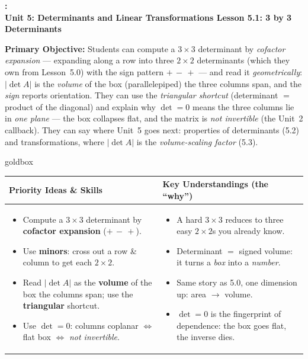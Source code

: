 \documentclass[10pt]{article}
\newcommand{\UnitNumberName}{Unit 5: Determinants and Linear Transformations \quad}
\newcommand{\LessonNumberName}{Lesson 5.1: 3 by 3 Determinants}
\begin{document}
\begin{center}
    {\Large\bfseries \CourseName: \SchoolYear \\
    {\small\bfseries \UnitNumberName \LessonNumberName}}
\end{center}

\begin{tcolorbox}[colback=blush, colframe=burgundy, boxrule=0.9pt, arc=2mm,
    left=2mm, right=2mm, top=1.5mm, bottom=1.5mm]
    \textbf{Primary Objective:} Students can compute a $3\times3$ determinant by \emph{cofactor
    expansion} --- expanding along a row into three $2\times2$ determinants (which they own from
    Lesson~5.0) with the sign pattern $+\,-\,+$ --- and read it \emph{geometrically}: $|\det A|$ is the
    \emph{volume} of the box (parallelepiped) the three columns span, and the \emph{sign} reports
    orientation. They can use the \emph{triangular shortcut} (determinant $=$ product of the diagonal)
    and explain why $\det=0$ means the three columns lie in \emph{one plane} --- the box collapses flat,
    and the matrix is \emph{not invertible} (the Unit~2 callback). They can say where Unit~5 goes next:
    properties of determinants (5.2) and transformations, where $|\det A|$ is the \emph{volume-scaling
    factor} (5.3).
\end{tcolorbox}

\renewcommand{\arraystretch}{1.4}
\begin{skillbox}{goldbox}
\begin{tabularx}{\linewidth}{@{}X|X@{}}
\textbf{Priority Ideas \& Skills} & \textbf{Key Understandings (the ``why'')} \\[2pt]
\hline
\vspace{-6pt}
\begin{itemize}[leftmargin=1.1em, nosep, after=\vspace{2pt}]
  \item Compute a $3\times3$ determinant by \textbf{cofactor expansion} ($+\,-\,+$).
  \item Use \textbf{minors}: cross out a row \& column to get each $2\times2$.
  \item Read $|\det A|$ as the \textbf{volume} of the box the columns span; use the \textbf{triangular} shortcut.
  \item Use $\det=0$: columns coplanar $\Leftrightarrow$ flat box $\Leftrightarrow$ \emph{not invertible}.
\end{itemize}
&
\vspace{-6pt}
\begin{itemize}[leftmargin=1.1em, nosep, after=\vspace{2pt}]
  \item A hard $3\times3$ reduces to three easy $2\times2$s you already know.
  \item Determinant $=$ signed volume: it turns a \emph{box} into a \emph{number}.
  \item Same story as 5.0, one dimension up: area $\to$ volume.
  \item $\det=0$ is the fingerprint of dependence: the box goes flat, the inverse dies.
\end{itemize}
\end{tabularx}
\end{skillbox}
\end{document}
